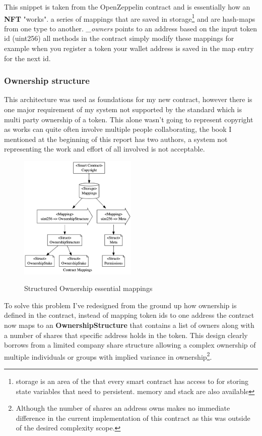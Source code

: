 This snippet is taken from the OpenZeppelin contract and is essentially how an \textbf{NFT} "works". a series of mappings that are saved in storage\footnote{storage is an area of the  that every smart contract has access to for storing state variables that need to persistent. memory and stack are also available} and are hash-maps from one type to another. \textit{\_owners} points to an address based on the input token id (uint256) all methods in the contract simply modify these mappings for example when you register a token your wallet address is saved in the map entry for the next id.

\subsubsection{Ownership structure}

This architecture was used as foundations for my new contract, however there is one major requirement of my system not supported by the \nft standard which is multi party ownership of a token. This alone wasn't going to represent copyright as works can quite often involve multiple people collaborating, the book I mentioned at the beginning of this report\cite{blockchain_revolution} has two authors, a system not representing the work and effort of all involved is not acceptable.

\begin{figure}[H]
\caption{Structured Ownership essential mappings}
\centering
\includegraphics[width=0.5\textwidth,height=0.5\textheight,keepaspectratio]{images/operational/mappings.png}
\label{fig:float}
\end{figure}

To solve this problem I've redesigned from the ground up how ownership is defined in the contract, instead of mapping token ids to one address the contract now maps to an \textbf{OwnershipStructure} that contains a list of owners along with a number of shares that specific address holds in the token. This design clearly borrows from a limited company share structure allowing a complex ownership of multiple individuals or groups with implied variance in ownership\footnote{Although the number of shares an address owns makes no immediate difference in the current implementation of this contract as this was outside of the desired complexity scope.}.

